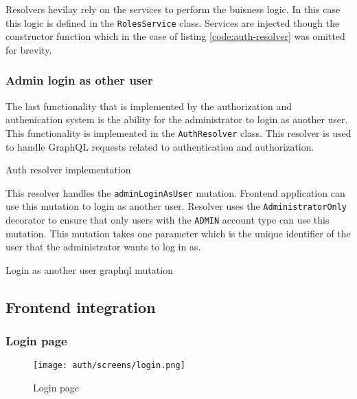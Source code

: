 \documentclass[../main.tex]{subfiles}
\begin{document}
Resolvers hevilay rely on the services to perform the buisness logic. In this case this logic is defined in the \texttt{RolesService} class.
Services are injected though the constructor function which in the case of listing \ref{code:auth-resolver} was omitted for brevity.


\subsubsection{Admin login as other user}

The last functionality that is implemented by the authorization and authenication system is the ability for the administrator to login as another user.
This functionality is implemented in the \texttt{AuthResolver} class. This resolver is used to handle GraphQL requests related to authentication and authorization.

\begin{listing}[H]
  \caption{Auth resolver implementation}
  \label{code:auth-resolver}
\end{listing}

This resolver handles the \texttt{adminLoginAsUser} mutation. Frontend application can use this mutation to login as another user.
Resolver uses the \texttt{AdministratorOnly} decorator to ensure that only users with the \texttt{ADMIN} account type can use this mutation.
This mutation takes one parameter which is the unique identifier of the user that the administrator wants to log in as.

\begin{listing}[H]
  \caption{Login as another user graphql mutation}
  \label{code:login-as-mutation}
\end{listing}



\subsection{Frontend integration}

\subsubsection{Login page}

\begin{figure}[H]
  \centering
  \texttt{[image: auth/screens/login.png]}
  \caption{Login page}
\end{figure}
\end{document}
